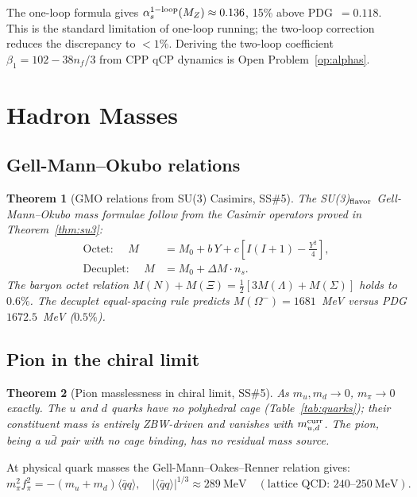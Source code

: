 \documentclass[11pt,a4paper]{article}
\newtheorem{theorem}{Theorem}[section]
\newcommand{\as}{\alpha_s}
\newcommand{\qqbar}{\langle\bar{q}q\rangle}
\begin{document}
The one-loop formula gives $\as^{\rm 1-loop}(M_Z) \approx 0.136$,
15\% above PDG~$= 0.118$.  This is the standard limitation of
one-loop running; the two-loop correction reduces the discrepancy
to $<1\%$.  Deriving the two-loop coefficient $\beta_1 = 102 -
38n_f/3$ from CPP qCP dynamics is Open Problem~\ref{op:alphas}.

\section{Hadron Masses}
\label{sec:hadrons}

\subsection{Gell-Mann--Okubo relations}

\begin{theorem}[GMO relations from SU(3) Casimirs, SS\#5]
\label{thm:gmo}
The SU(3)$_{\rm flavor}$ Gell-Mann--Okubo mass formulae follow from
the Casimir operators proved in Theorem~\ref{thm:su3}:
\begin{align}
\text{Octet: }\quad
M &= M_0 + b\,Y + c\left[I(I+1) - \tfrac{Y^2}{4}\right],
\label{eq:gmo_o} \\
\text{Decuplet: }\quad
M &= M_0 + \Delta M\cdot n_s.
\label{eq:gmo_d}
\end{align}
The baryon octet relation $M(N)+M(\Xi) = \frac{1}{2}[3M(\Lambda)+M(\Sigma)]$
holds to $0.6\%$.  The decuplet equal-spacing rule predicts
$M(\Omega^-) = 1681$~MeV versus PDG $1672.5$~MeV ($0.5\%$).
\end{theorem}

\subsection{Pion in the chiral limit}

\begin{theorem}[Pion masslessness in chiral limit, SS\#5]
\label{thm:pion}
As $m_u, m_d \to 0$, $m_\pi \to 0$ exactly.  The $u$ and $d$
quarks have no polyhedral cage (Table~\ref{tab:quarks}); their
constituent mass is entirely ZBW-driven and vanishes with
$m_{u,d}^{\rm curr}$.  The pion, being a $u\bar{d}$ pair with
no cage binding, has no residual mass source.
\end{theorem}

At physical quark masses the Gell-Mann--Oakes--Renner relation gives:
\begin{equation}
m_\pi^2 f_\pi^2 = -(m_u+m_d)\qqbar,\quad
|\qqbar|^{1/3} \approx 289\ \text{MeV}
\quad(\text{lattice QCD: }240\text{--}250\ \text{MeV}).
\label{eq:gor}
\end{equation}
\end{document}
